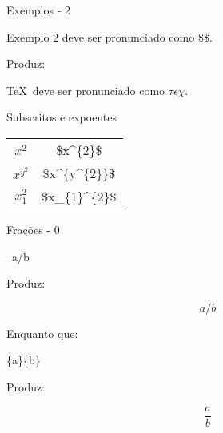 \begin{frame}{Exemplos - 2}
	\begin{Codigo}{Exemplo 2}
		\LCmd{\textvisiblespace} deve ser pronunciado como\n
		\$\string\tau\string\epsilon\string\chi\$.
	\end{Codigo}
	
	\pause
	Produz:
	
	\begin{Resultado}{}
		\TeX\ deve ser pronunciado como
		$\tau\epsilon\chi$.
	\end{Resultado}
\end{frame}

\begin{frame}{Subscritos e expoentes}
	\begin{center}
		\let\tt\ttfamily
		\begin{tabular}{cc}
			$x^{2}$ & \tt\$x\string^\{2\}\$ \\
			$x^{y^{2}}$ & \tt\$x\string^\{y\string^\{2\}\}\$ \\
			$x_{1}^{2}$ & \tt\$x\string_\{1\}\string^\{2\}\$\\
		\end{tabular}
	\end{center}
\end{frame}

\begin{frame}{Frações - 0}
	\begin{Codigo}{}
		\bs\ls\ a/b \bs\rs
	\end{Codigo}

    \pause
	Produz: 

	\begin{Resultado}{}
		\[a/b\]
	\end{Resultado}
	
	\pause
	Enquanto que:

	\begin{Codigo}{}
		\bs\ls \string\frac\{a\}\{b\} \bs\rs
	\end{Codigo}
	
	\pause
	Produz:

	\begin{Resultado}{}
		\[\frac{a}{b}\]
	\end{Resultado}
\end{frame}

